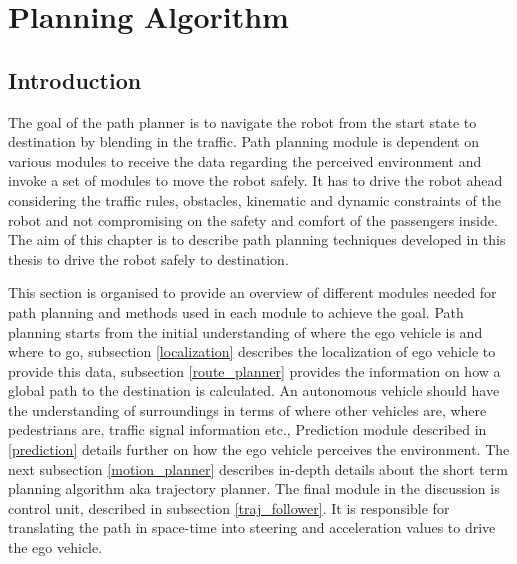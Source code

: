 \chapter{Planning Algorithm}
\label{planning_algo}
\section{Introduction}


The goal of the path planner is to navigate the robot from the start state to destination by blending in the traffic. Path planning module is dependent on various modules to receive the data regarding the perceived environment and invoke a set of modules to move the robot safely. It has to drive the robot ahead considering the traffic rules, obstacles, kinematic and dynamic constraints of the robot and not compromising on the safety and comfort of the passengers inside. The aim of this chapter is to describe path planning techniques developed in this thesis to drive the robot safely to destination.

This section is organised to provide an overview of different modules needed for path planning and methods used in each module to achieve the goal. Path planning starts from the initial understanding of where the ego vehicle is and where to go, subsection \ref{localization} describes the localization of ego vehicle to provide this data, subsection \ref{route_planner} provides the information on how a global path to the destination is calculated. An autonomous vehicle should have the understanding of surroundings in terms of where other vehicles are, where pedestrians are, traffic signal information etc., Prediction module described in \ref{prediction} details further on how the ego vehicle perceives the environment. The next subsection \ref{motion_planner} describes in-depth details about the short term planning algorithm aka trajectory planner. The final module in the discussion is control unit, described in subsection \ref{traj_follower}. It is responsible for translating the path in space-time into steering and acceleration values to drive the ego vehicle.

